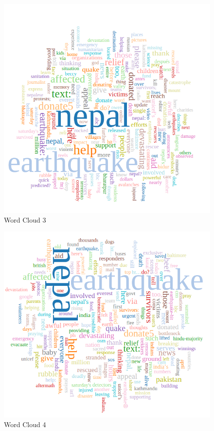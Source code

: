 \begin{enumerate}
\newpage
\begin{figure}[ht]    
    \begin{center}
        \includegraphics[scale=0.40]{graphs/wc3.png}
        \caption{Word Cloud 3}
    \end{center}
\end{figure}

\newpage
\begin{figure}[ht]    
    \begin{center}
        \includegraphics[scale=0.40]{graphs/wc4.png}
        \caption{Word Cloud 4}
    \end{center}
\end{figure}


\end{enumerate}
